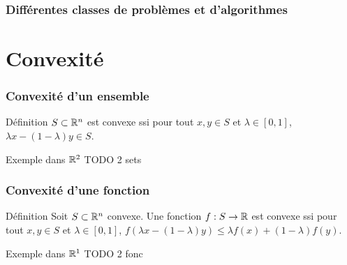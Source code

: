 \documentclass{beamer}
\newcommand{\R}{{\ensuremath\mathbb{R}}}
\begin{document}
\begin{frame}
  \frametitle{Différentes classes de problèmes et d'algorithmes}

  
\end{frame}

\section{Convexité}

\begin{frame}
  \frametitle{Convexité d'un ensemble}

  \begin{block}{Définition}
    $S \subset \R^n$ est convexe ssi  
    pour tout $x,y \in S$ et $\lambda \in [0,1]$,
    $\lambda x - (1 - \lambda) y \in S$. 
  \end{block}

  \begin{exampleblock}{Exemple dans $\R^2$}
    TODO 2 sets
  \end{exampleblock}
  
\end{frame}

\begin{frame}
  \frametitle{Convexité d'une fonction}

  \begin{block}{Définition}
     Soit $S \subset \R^n$ convexe.
     Une fonction $f : S \rightarrow \R$ est convexe ssi  
    pour tout $x,y \in S$ et $\lambda \in [0,1]$,
    $f(\lambda x - (1 - \lambda) y) \leq \lambda f(x) + (1 - \lambda) f(y)$. 
  \end{block}

  \begin{exampleblock}{Exemple dans $\R^1$}
    TODO 2 fonc
  \end{exampleblock}
  
\end{frame}
\end{document}
